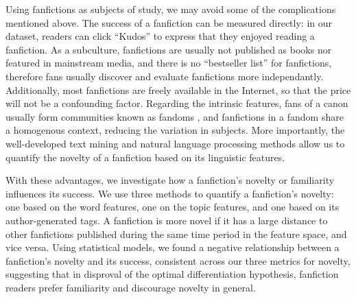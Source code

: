 \documentclass[a4paper]{article}
\begin{document}
Using fanfictions as subjects of study, we may avoid some of the complications mentioned above. The success of a fanfiction can be measured directly: in our dataset, readers can click ``Kudos'' to express that they enjoyed reading a fanfiction. As a subculture, fanfictions are usually not published as books nor featured in mainstream media, and there is no ``bestseller list'' for fanfictions, therefore fans usually discover and evaluate fanfictions more independantly. Additionally, most fanfictions are freely available in the Internet, so that the price will not be a confounding factor. Regarding the intrinsic features, fans of a canon usually form communities known as fandoms \cite{wiki:fandom}, and fanfictions in a fandom share a homogenous context, reducing the variation in subjects. More importantly, the well-developed text mining and natural language processing methods allow us to quantify the novelty of a fanfiction based on its linguistic features.

With these advantages, we investigate how a fanfiction's novelty or familiarity influences its success. We use three methods to quantify a fanfiction's novelty: one based on the word features, one on the topic features, and one based on its author-generated tags. A fanfiction is more novel if it has a large distance to other fanfictions published during the same time period in the feature space, and vice versa. Using statistical models, we found a negative relationship between a fanfiction's novelty and its success, consistent across our three metrics for novelty, suggesting that in disproval of the optimal differentiation hypothesis, fanfiction readers prefer familiarity and discourage novelty in general.




\end{document}
